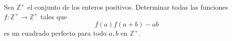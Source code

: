 Sea $\mathbb Z^+$ el conjunto de los enteros positivos. Determinar todas las funciones $f:\mathbb Z^+\to\mathbb Z^+$ tales que \[f(a)f(a+b)-ab\] es un cuadrado perfecto para todo $a,b$ en $\mathbb Z^+$.